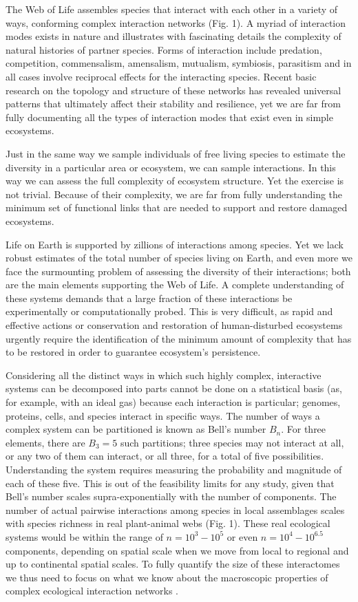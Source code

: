 \documentclass[10pt,letterpaper]{article}
\begin{document}
The Web of Life assembles species that interact with each other in a variety of ways, conforming complex interaction networks (Fig. 1). A myriad of interaction modes exists in nature and illustrates with fascinating details the complexity of natural histories of partner species. Forms of interaction include predation, competition, commensalism, amensalism, mutualism, symbiosis, parasitism and in all cases involve reciprocal effects for the interacting species. Recent basic research on the topology and structure of these networks has revealed universal patterns that ultimately affect their stability and resilience, yet we are far from fully documenting all the types of interaction modes that exist even in simple ecosystems. 

Just in the same way we sample individuals of free living species to estimate the diversity in a particular area or ecosystem, we can sample interactions. In this way we can assess the full complexity of ecosystem structure. Yet the exercise is not trivial. Because of their complexity, we are far from fully understanding the minimum set of functional links that are needed to support and restore damaged ecosystems.

Life on Earth is supported by zillions of interactions among species. Yet we lack robust estimates of the total number of species living on Earth, and even more we face the surmounting problem of assessing the diversity of their interactions; both are the main elements supporting the Web of Life. A complete understanding of these systems demands that a large fraction of these interactions be experimentally or computationally probed. This is very difficult, as rapid and effective actions or conservation and restoration of human-disturbed ecosystems urgently require the identification of the minimum amount of complexity that has to be restored in order to guarantee ecosystem’s persistence. 

Considering all the distinct ways in which such highly complex, interactive systems can be decomposed into parts cannot be done on a statistical basis (as, for example, with an ideal gas) because each interaction is particular; genomes, proteins, cells, and species interact in specific ways. The number of ways a complex system can be partitioned is known as Bell’s number $B_n$\cite{Koch:2012aa}. For three elements, there are $B_3 = 5$ such partitions; three species may not interact at all, or any two of them can interact, or all three, for a total of five possibilities. Understanding the system requires measuring the probability and magnitude of each of these five. This is out of the feasibility limits for any study\cite{Koch:2012aa}, given that Bell’s number scales supra-exponentially with the number of components. The number of actual pairwise interactions among species in local assemblages scales with species richness in real plant-animal webs (Fig. 1). These real ecological systems would be within the range of $n= 10^3-10^5$ or even $n= 10^4-10^{6.5}$ components, depending on spatial scale when we move from local to regional and up to continental spatial scales. To fully quantify the size of these interactomes we thus need to focus on what we know about the macroscopic properties of complex ecological interaction networks \cite{Thompson:2009}. 
\end{document}

